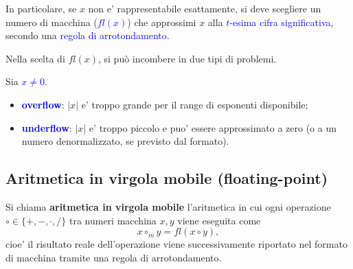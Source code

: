 In particolare, se $x$ non e' rappresentabile esattamente, si deve scegliere un numero di macchina (\textcolor{blue}{$fl(x)$}) che approssimi $x$
alla \textcolor{blue}{$t$-esima cifra  significativa}, secondo una \textcolor{blue}{regola di arrotondamento}.

Nella scelta di $fl(x)$, si può incombere in due tipi di problemi.

\begin{defi}
Sia \textcolor{blue}{$x\neq 0$}.
\begin{itemize}
    \item \textcolor{blue}{\textbf{overflow}}: $|x|$ e' troppo grande per il range di esponenti disponibile;
    \item \textcolor{blue}{\textbf{underflow}}: $|x|$ e' troppo piccolo e puo' essere approssimato a zero
    (o a un numero denormalizzato, se previsto dal formato).
\end{itemize}
\end{defi}

\subsection*{Aritmetica in virgola mobile (floating-point)}

\begin{defi}
Si chiama \textbf{aritmetica in virgola mobile} l'aritmetica in cui ogni operazione
$\circ\in\{+, -, \cdot, /\}$ tra numeri macchina $x,y$ viene eseguita come
\[
x \circ_m y = fl(x \circ y),
\]
cioe' il risultato reale dell'operazione viene successivamente riportato nel formato di macchina
tramite una regola di arrotondamento.
\end{defi}

